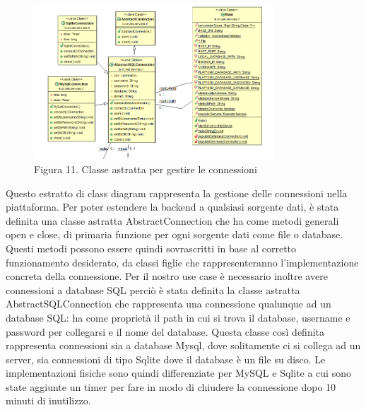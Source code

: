 \clearpage
\begin{figure}[h]
	\centering
	\includegraphics[width=0.8\textwidth]{main.png}
	\caption*{Figura 11. Classe astratta per gestire le connessioni}
\end{figure}

Questo estratto di class diagram rappresenta la gestione delle connessioni nella piattaforma. Per poter estendere la backend a qualsiasi sorgente dati, è stata definita una classe astratta AbstractConnection che ha come metodi generali open e close, di primaria funzione per ogni sorgente dati come file o database. Questi metodi possono essere quindi sovrascritti in base al corretto funzionamento desiderato, da classi figlie che rappresenteranno l’implementazione concreta della connessione. Per il nostro use case è necessario inoltre avere connessioni a database SQL perciò è stata definita la classe astratta AbstractSQLConnection che rappresenta una connessione qualunque ad un database SQL: ha come proprietà il path in cui si trova il database, username e password per collegarsi e il nome del database. Questa classe così definita rappresenta connessioni sia a database Mysql, dove solitamente ci si collega ad un server, sia connessioni di tipo Sqlite dove il database è un file su disco. Le implementazioni fisiche sono quindi differenziate per MySQL e Sqlite a cui sono state aggiunte un timer per fare in modo di chiudere la connessione dopo 10 minuti di inutilizzo.
\clearpage
